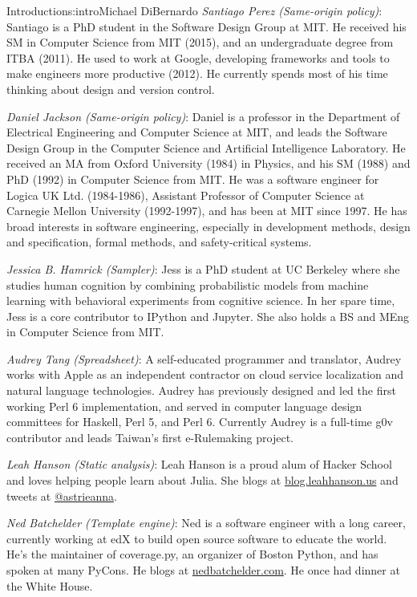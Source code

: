 \begin{aosachapter}{Introduction}{s:intro}{Michael DiBernardo}
\emph{Santiago Perez (Same-origin policy)}: Santiago is a PhD student in the Software Design Group at MIT. He received his SM in Computer Science from MIT (2015), and an undergraduate degree from ITBA (2011). He used to work at Google, developing frameworks and tools to make engineers more productive (2012). He currently spends most of his time thinking about design and version control.

\emph{Daniel Jackson (Same-origin policy)}: Daniel is a professor in the Department of Electrical Engineering and Computer Science at MIT, and leads the Software Design Group in the Computer Science and Artificial Intelligence Laboratory. He received an MA from Oxford University (1984) in Physics, and his SM (1988) and PhD (1992) in Computer Science from MIT. He was a software engineer for Logica UK Ltd. (1984-1986), Assistant Professor of Computer Science at Carnegie Mellon University (1992-1997), and has been at MIT since 1997. He has broad interests in software engineering, especially in development methods, design and specification, formal methods, and safety-critical systems.

\emph{Jessica B. Hamrick (Sampler)}: Jess is a PhD student at UC Berkeley where she studies human cognition by combining probabilistic models from machine learning with behavioral experiments from cognitive science. In her spare time, Jess is a core contributor to IPython and Jupyter. She also holds a BS and MEng in Computer Science from MIT.

\emph{Audrey Tang (Spreadsheet)}: A self-educated programmer and translator, Audrey works with Apple as an independent contractor on cloud service localization and natural language technologies. Audrey has previously designed and led the first working Perl 6 implementation, and served in computer language design committees for Haskell, Perl 5, and Perl 6. Currently Audrey is a full-time g0v contributor and leads Taiwan’s first e-Rulemaking project.

\emph{Leah Hanson (Static analysis)}: Leah Hanson is a proud alum of Hacker School and loves helping people learn about Julia. She blogs at \url{blog.leahhanson.us} and tweets at \url{@astrieanna}.

\emph{Ned Batchelder (Template engine)}: Ned is a software engineer with a long career, currently working at edX to build open source software to educate the world.  He's the maintainer of coverage.py, an organizer of Boston Python, and has spoken at many PyCons.  He blogs at \url{nedbatchelder.com}. He once had dinner at the White House.


\end{aosachapter}
